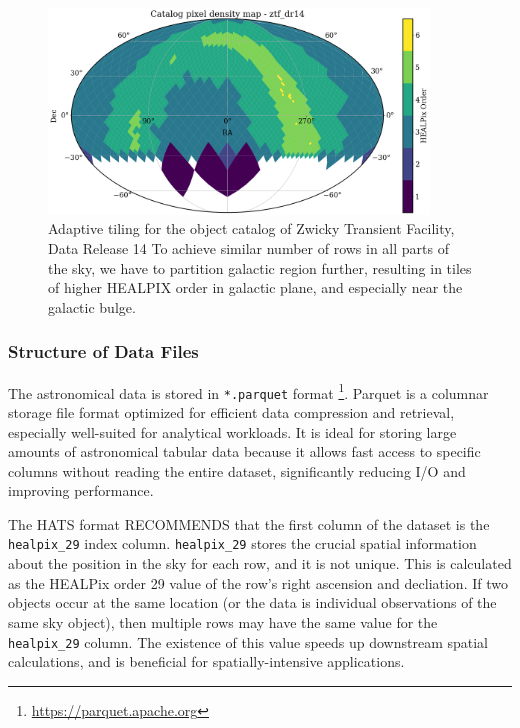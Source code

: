 \documentclass[11pt,a4paper]{ivoa}
\begin{document}
\begin{figure}
\centering
\includegraphics[width=0.9\textwidth]{order-pix.png}
\caption{Adaptive tiling for the object catalog of Zwicky Transient Facility, Data Release 14 \citep{ztf:Bellm2019, ztf:Masci2019} To achieve similar number of rows in all parts of the sky, we have to partition galactic region further, resulting in tiles of higher HEALPIX order in galactic plane, and especially near the galactic bulge. }
\label{fig:order}
\end{figure}


\subsubsection{Structure of Data Files} \label{sec:parquet}
The astronomical data is stored in \texttt{*.parquet} format \footnote{\href{https://parquet.apache.org}{https://parquet.apache.org}}.
Parquet is a columnar storage file format optimized for efficient data compression and retrieval, especially well-suited for analytical workloads. 
It is ideal for storing large amounts of astronomical tabular data because it allows fast access to specific columns without reading the entire dataset, significantly reducing I/O and improving performance. \par

The HATS format RECOMMENDS that the first column of the dataset is the \texttt{healpix\_29} index column.  
\texttt{healpix\_29} stores the crucial spatial information about the position in the sky for each row, and it is not unique.
This is calculated as the HEALPix order 29 value of the row's right ascension and decliation. 
If two objects occur at the same location (or the data is individual observations of the same sky object), then multiple rows may have the same value for the \texttt{healpix\_29} column.
The existence of this value speeds up downstream spatial calculations, and is beneficial for spatially-intensive applications.
\end{document}
